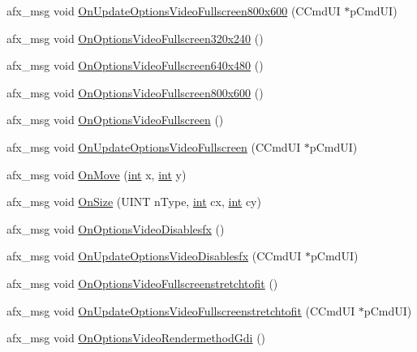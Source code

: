 \begin{DoxyCompactItemize}
afx\+\_\+msg void \mbox{\hyperlink{class_main_wnd_ac7f87e2d41aa1674be4489729c87526c}{On\+Update\+Options\+Video\+Fullscreen800x600}} (C\+Cmd\+UI $\ast$p\+Cmd\+UI)
\item 
afx\+\_\+msg void \mbox{\hyperlink{class_main_wnd_a6cdf116ca046f531f38d3d4ecb506f93}{On\+Options\+Video\+Fullscreen320x240}} ()
\item 
afx\+\_\+msg void \mbox{\hyperlink{class_main_wnd_ae205b52e438eb0305310ca81436967db}{On\+Options\+Video\+Fullscreen640x480}} ()
\item 
afx\+\_\+msg void \mbox{\hyperlink{class_main_wnd_a2b287efa1b6df3057aedd5e5e6a85d6e}{On\+Options\+Video\+Fullscreen800x600}} ()
\item 
afx\+\_\+msg void \mbox{\hyperlink{class_main_wnd_af40af1ba864ff1718ef3fe96279656d2}{On\+Options\+Video\+Fullscreen}} ()
\item 
afx\+\_\+msg void \mbox{\hyperlink{class_main_wnd_a6d5a346212032eb5299be7575fbafb60}{On\+Update\+Options\+Video\+Fullscreen}} (C\+Cmd\+UI $\ast$p\+Cmd\+UI)
\item 
afx\+\_\+msg void \mbox{\hyperlink{class_main_wnd_ab6523035512af1482f5a9656ea556661}{On\+Move}} (\mbox{\hyperlink{_util_8cpp_a0ef32aa8672df19503a49fab2d0c8071}{int}} x, \mbox{\hyperlink{_util_8cpp_a0ef32aa8672df19503a49fab2d0c8071}{int}} y)
\item 
afx\+\_\+msg void \mbox{\hyperlink{class_main_wnd_a8aae2e29b1e1426dbfce42deade38485}{On\+Size}} (U\+I\+NT n\+Type, \mbox{\hyperlink{_util_8cpp_a0ef32aa8672df19503a49fab2d0c8071}{int}} cx, \mbox{\hyperlink{_util_8cpp_a0ef32aa8672df19503a49fab2d0c8071}{int}} cy)
\item 
afx\+\_\+msg void \mbox{\hyperlink{class_main_wnd_a18272b2ec178d9123804805b82fc3db6}{On\+Options\+Video\+Disablesfx}} ()
\item 
afx\+\_\+msg void \mbox{\hyperlink{class_main_wnd_aab300c45188274983a69dcddb774b1d8}{On\+Update\+Options\+Video\+Disablesfx}} (C\+Cmd\+UI $\ast$p\+Cmd\+UI)
\item 
afx\+\_\+msg void \mbox{\hyperlink{class_main_wnd_a261e810d4a9386c968d30a3449389f54}{On\+Options\+Video\+Fullscreenstretchtofit}} ()
\item 
afx\+\_\+msg void \mbox{\hyperlink{class_main_wnd_a7556a5adf4120d6c9561f21e4a9fea82}{On\+Update\+Options\+Video\+Fullscreenstretchtofit}} (C\+Cmd\+UI $\ast$p\+Cmd\+UI)
\item 
afx\+\_\+msg void \mbox{\hyperlink{class_main_wnd_a0418a1b43cf05159e2e0679bc538e669}{On\+Options\+Video\+Rendermethod\+Gdi}} ()
\item 

\end{DoxyCompactItemize}
